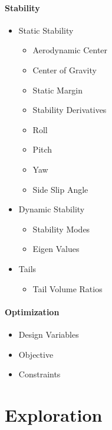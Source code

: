 \documentclass[11pt]{article}
\begin{document}
\paragraph{Stability}
\begin{itemize}
	\item Static Stability
	\begin{itemize}
		\item Aerodynamic Center
		\item Center of Gravity
		\item Static Margin
		\item Stability Derivatives
		\item Roll
		\item Pitch
		\item Yaw
		\item Side Slip Angle
	\end{itemize}
	\item Dynamic Stability
	\begin{itemize}
		\item Stability Modes
		\item Eigen Values
	\end{itemize}
	\item Tails
	\begin{itemize}
		\item Tail Volume Ratios
	\end{itemize}
\end{itemize}

\paragraph{Optimization}
\begin{itemize}
	\item Design Variables
	\item Objective
	\item Constraints
\end{itemize}

\newpage



\newpage
\section{Exploration}
\label{sec:exploration}
\end{document}
